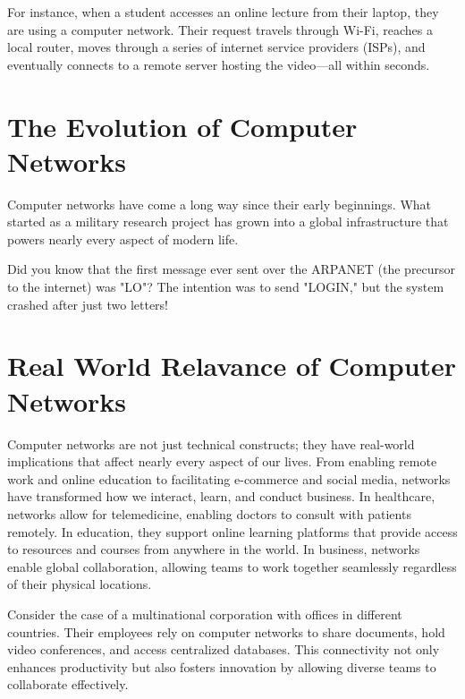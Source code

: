 \begin{examplebox}
    For instance, when a student accesses an online lecture from their laptop, they are using a computer network. Their request travels through Wi-Fi, reaches a local router, moves through a series of internet service providers (ISPs), and eventually connects to a remote server hosting the video—all within seconds.
\end{examplebox}

\section{The Evolution of Computer Networks}
Computer networks have come a long way since their early beginnings. What started as a military research project has grown into a global infrastructure that powers nearly every aspect of modern life.




\begin{didyouknowbox}
    Did you know that the first message ever sent over the ARPANET (the precursor to the internet) was "LO"? The intention was to send "LOGIN," but the system crashed after just two letters!
\end{didyouknowbox}


\section{Real World Relavance of Computer Networks}
Computer networks are not just technical constructs; they have real-world implications that affect nearly every aspect of our lives. From enabling remote work and online education to facilitating e-commerce and social media, networks have transformed how we interact, learn, and conduct business.
In healthcare, networks allow for telemedicine, enabling doctors to consult with patients remotely. In education, they support online learning platforms that provide access to resources and courses from anywhere in the world. In business, networks enable global collaboration, allowing teams to work together seamlessly regardless of their physical locations.
\begin{casestudybox}
    Consider the case of a multinational corporation with offices in different countries. Their employees rely on computer networks to share documents, hold video conferences, and access centralized databases. This connectivity not only enhances productivity but also fosters innovation by allowing diverse teams to collaborate effectively.
\end{casestudybox}

